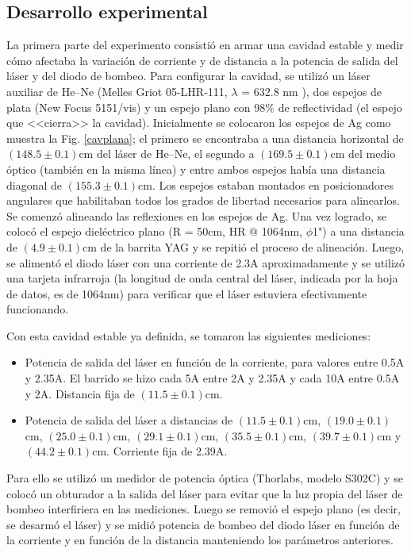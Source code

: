 \documentclass[10pt, a4paper]{article}%
\begin{document}
\begin{multicols}{2}
\section*{Desarrollo experimental}
La primera parte del experimento consistió en armar una cavidad estable y medir cómo afectaba la variación de corriente y de distancia a la potencia de salida del láser y del diodo de bombeo. Para configurar la cavidad, se utilizó un láser auxiliar de He--Ne (Melles Griot 05-LHR-111, $\lambda$ = 632.8 nm ), dos espejos de plata (New Focus 5151/vis) y un espejo plano con 98\% de reflectividad (el espejo que <<cierra>> la cavidad). Inicialmente se colocaron los espejos de Ag como muestra la Fig. \ref{cavplana}; el primero se encontraba a una distancia horizontal de $(148.5 \pm 0.1)$cm del láser de He--Ne, el segundo a $(169.5 \pm 0.1)$cm del medio óptico (también en la misma línea) y entre ambos espejos había una distancia diagonal de $(155.3 \pm 0.1)$cm. Los espejos estaban montados en posicionadores angulares que habilitaban todos los grados de libertad necesarios para alinearlos. Se comenzó alineando las reflexiones en los espejos de Ag. Una vez logrado, se colocó el espejo dieléctrico plano (R = 50cm, HR @ 1064nm, $\phi$1") a una distancia de $(4.9 \pm 0.1)$cm de la barrita YAG y se repitió el proceso de alineación. Luego, se alimentó el diodo láser con una corriente de 2.3A aproximadamente y se utilizó una tarjeta infrarroja (la longitud de onda central del láser, indicada por la hoja de datos, es de 1064nm) para verificar que el láser estuviera efectivamente funcionando. 

Con esta cavidad estable ya definida, se tomaron las siguientes mediciones:
\begin{itemize}
    \item Potencia de salida del láser en función de la corriente, para valores entre 0.5A y 2.35A. El barrido se hizo cada 5A entre 2A y 2.35A y cada 10A entre 0.5A y 2A. Distancia fija de $(11.5 \pm 0.1)$cm. 
    \item Potencia de salida del láser a distancias de $(11.5 \pm 0.1)$cm, $(19.0 \pm 0.1)$cm, $(25.0 \pm 0.1)$cm, $(29.1 \pm 0.1)$cm, $(35.5 \pm 0.1)$cm, $(39.7 \pm 0.1)$cm y $(44.2 \pm 0.1)$cm. Corriente fija de 2.39A. 
\end{itemize}
Para ello se utilizó un medidor de potencia óptica (Thorlabs, modelo S302C) y se colocó un obturador a la salida del láser para evitar que la luz propia del láser de bombeo interfiriera en las mediciones. Luego se removió el espejo plano (es decir, se desarmó el láser) y se midió potencia de bombeo del diodo láser en función de la corriente y en función de la distancia manteniendo los parámetros anteriores. 


\end{multicols}
\end{document}
